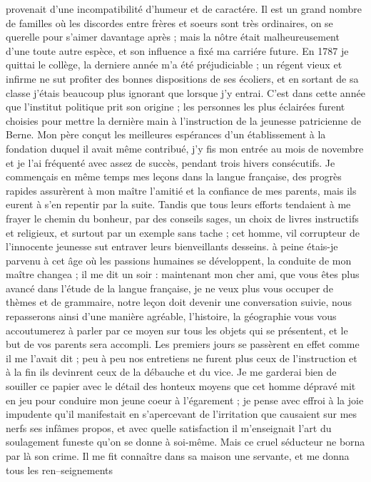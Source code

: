 \documentclass[12pt]{article}
\begin{document}
 provenait d’une incompatibilité d’humeur et
de caractére. Il est un grand nombre de familles où les discordes entre frères et soeurs sont très
ordinaires, on se querelle pour s’aimer davantage après ; mais la nôtre était malheureusement d’une
toute autre espèce, et son influence a fixé ma carriére future. En 1787 je quittai le collège, la
derniere année m’a été préjudiciable ; un régent vieux et infirme ne sut profiter des bonnes
dispositions de ses écoliers, et en sortant de sa classe j’étais beaucoup plus ignorant que lorsque
j’y entrai. C’est dans cette année que l’institut politique prit son origine ; les personnes les
plus éclairées furent choisies pour mettre la dernière main à l’instruction de la jeunesse
patricienne de Berne. Mon père conçut les meilleures espérances d’un établissement à la fondation
duquel il avait même contribué, j’y fis mon entrée au mois de novembre et je l’ai fréquenté avec
assez de succès, pendant trois hivers consécutifs. Je commençais en même temps mes leçons dans la
langue française, des progrès rapides assurèrent à mon maître l’amitié et la confiance de mes
parents, mais ils eurent à s’en repentir par la suite. Tandis que tous leurs efforts tendaient à me
frayer le chemin du bonheur, par des conseils sages, un choix de livres instructifs et religieux, et
surtout par un exemple sans tache ; cet homme, vil corrupteur de l’innocente jeunesse sut entraver
leurs bienveillants desseins. à peine étais-je parvenu à cet âge où les passions humaines se
développent, la conduite de mon maître changea ; il me dit un soir : maintenant mon cher ami, que
vous êtes plus avancé dans l’étude de la langue française, je ne veux plus vous occuper de thèmes et
de grammaire, notre leçon doit devenir une conversation suivie, nous repasserons ainsi d’une manière
agréable, l’histoire, la géographie vous vous accoutumerez à parler par ce moyen sur tous les objets
qui se présentent, et le but de vos parents sera accompli. Les premiers jours se passèrent en effet
comme il me l’avait dit ; peu à peu nos entretiens ne furent plus ceux de l’instruction et à la fin
ils devinrent ceux de la débauche et du vice. Je me garderai bien de souiller ce papier avec le
détail des honteux moyens que cet homme dépravé mit en jeu pour conduire mon jeune coeur à
l’égarement ; je pense avec effroi à la joie impudente qu’il manifestait en s’apercevant de
l’irritation que causaient sur mes nerfs ses infâmes propos, et avec quelle satisfaction il
m’enseignait l’art du soulagement funeste qu’on se donne à soi-même. Mais ce cruel séducteur ne
borna par là son crime. Il me fit connaître dans sa maison une servante, et me donna tous les
ren–seignements
\end{document}
